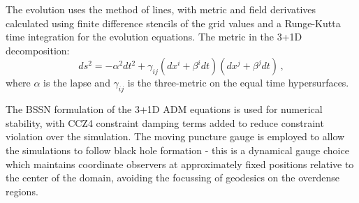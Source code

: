 \documentclass[11pt,a4paper]{article}
\begin{document}
The evolution uses the method of lines, with metric and field derivatives calculated using finite difference stencils of the grid values and a Runge-Kutta time integration for the evolution equations. The metric in the 3+1D decomposition:
\begin{equation}
ds^2 = - \alpha^2 dt^2 + \gamma_{ij} (dx^i + \beta^i dt) (dx^j + \beta^j dt) \,,
\end{equation}
where $\alpha$ is the lapse and $\gamma_{ij}$ is the three-metric on the equal time hypersurfaces.

The BSSN formulation \cite{Nakamura:1987zz,Shibata:1995we,Baumgarte:1998te} of the 3+1D ADM equations \cite{Arnowitt:1962hi} is used for numerical stability, with CCZ4 \cite{Alic:2011gg} constraint damping terms added to reduce constraint violation over the simulation. The moving puncture gauge  \cite{Pretorius:2005gq,Baker:2005vv,Campanelli:2005dd} is employed to allow the simulations to follow black hole formation - this is a dynamical gauge choice which maintains coordinate observers at approximately fixed positions relative to the center of the domain, avoiding the focussing of geodesics on the overdense regions.
\end{document}
